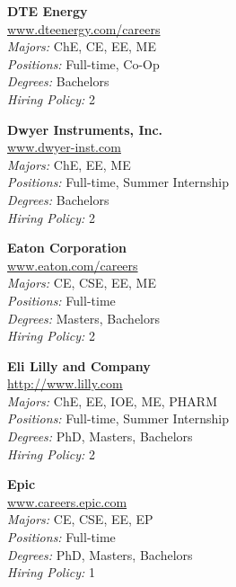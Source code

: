 \documentclass[twoside]{article}
\begin{document}
\begin{center}
\begin{multicols}{3}
\begin{minipage}{.9\columnwidth}{\Large\bf DTE Energy }\\
	\url{www.dteenergy.com/careers}\\
	\emph{Majors:} ChE, CE, EE, ME\\
	\emph{Positions:} Full-time, Co-Op\\
	\emph{Degrees:} Bachelors\\
	\emph{Hiring Policy:} 2\\
\end{minipage}
 
\begin{minipage}{.9\columnwidth}{\Large\bf Dwyer Instruments, Inc. }\\
	\url{www.dwyer-inst.com}\\
	\emph{Majors:} ChE, EE, ME\\
	\emph{Positions:} Full-time, Summer Internship\\
	\emph{Degrees:} Bachelors\\
	\emph{Hiring Policy:} 2\\
\end{minipage}
 
\begin{minipage}{.9\columnwidth}{\Large\bf Eaton Corporation }\\
	\url{www.eaton.com/careers}\\
	\emph{Majors:} CE, CSE, EE, ME\\
	\emph{Positions:} Full-time\\
	\emph{Degrees:} Masters, Bachelors\\
	\emph{Hiring Policy:} 2\\
\end{minipage}
 
\begin{minipage}{.9\columnwidth}{\Large\bf Eli Lilly and Company }\\
	\url{http://www.lilly.com}\\
	\emph{Majors:} ChE, EE, IOE, ME, PHARM\\
	\emph{Positions:} Full-time, Summer Internship\\
	\emph{Degrees:} PhD, Masters, Bachelors\\
	\emph{Hiring Policy:} 2\\
\end{minipage}
 
\begin{minipage}{.9\columnwidth}{\Large\bf Epic }\\
	\url{www.careers.epic.com}\\
	\emph{Majors:} CE, CSE, EE, EP\\
	\emph{Positions:} Full-time\\
	\emph{Degrees:} PhD, Masters, Bachelors\\
	\emph{Hiring Policy:} 1\\
\end{minipage}
 

\end{multicols}
\end{center}
\end{document}
